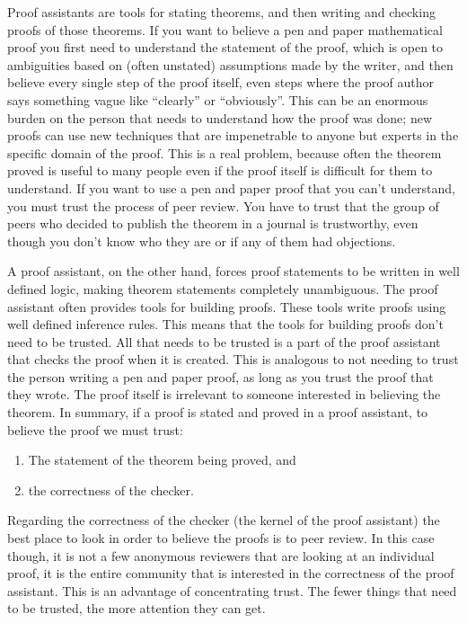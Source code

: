 \documentclass{puthesis}
\begin{document}
Proof assistants are tools for stating theorems, and then writing and
checking proofs of those theorems. If you want to believe a pen and
paper mathematical proof you first need to understand the statement of
the proof, which is open to ambiguities based on (often unstated)
assumptions made by the writer, and then believe every single step of
the proof itself, even steps where the proof author says something
vague like ``clearly'' or ``obviously''. This can be an enormous
burden on the person that needs to understand how the proof was done;
new proofs can use new techniques that are impenetrable to anyone but
experts in the specific domain of the proof. This is a real problem,
because often the theorem proved is useful to many people even if the
proof itself is difficult for them to understand. If you want to use a
pen and paper proof that you can't understand, you must trust the
process of peer review. You have to trust that the group of peers who
decided to publish the theorem in a journal is trustworthy, even
though you don't know who they are or if any of them had objections.

A proof assistant, on the other hand, forces proof statements to be
written in well defined logic, making theorem statements completely
unambiguous. The proof assistant often provides tools for building
proofs. These tools write proofs using well defined inference rules.
This means that the tools for building proofs don't need to be
trusted. All that needs to be trusted is a part of the proof assistant
that checks the proof when it is created. This is analogous to not
needing to trust the person writing a pen and paper proof, as long as
you trust the proof that they wrote. The proof itself is irrelevant to
someone interested in believing the theorem. In summary, if a proof is
stated and proved in a proof assistant, to believe the proof we must
trust:

\begin{enumerate}
  \item The statement of the theorem being proved, and
  \item the correctness of the checker. 
\end{enumerate}

Regarding the correctness of the checker (the kernel of the proof
assistant) the best place to look in order to believe the proofs is to
peer review. In this case though, it is not a few anonymous reviewers
that are looking at an individual proof, it is the entire community
that is interested in the correctness of the proof assistant. This is
an advantage of concentrating trust. The fewer things that need to be
trusted, the more attention they can get.
\end{document}
